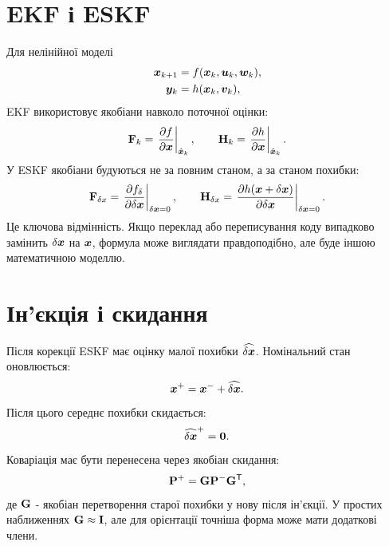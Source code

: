 \section{EKF і ESKF}

Для нелінійної моделі
\begin{align}
\bm{x}_{k+1}&=f(\bm{x}_k,\bm{u}_k,\bm{w}_k),\\
\bm{y}_k&=h(\bm{x}_k,\bm{v}_k),
\end{align}
EKF використовує якобіани навколо поточної оцінки:
\begin{equation}
\mathbf{F}_k=\left.\frac{\partial f}{\partial\bm{x}}\right|_{\hat{\bm{x}}_k},
\qquad
\mathbf{H}_k=\left.\frac{\partial h}{\partial\bm{x}}\right|_{\hat{\bm{x}}_k}.
\end{equation}
У ESKF якобіани будуються не за повним станом, а за станом похибки:
\begin{equation}
\mathbf{F}_{\delta x}=\left.\frac{\partial f_\delta}{\partial\delta\bm{x}}\right|_{\delta\bm{x}=0},
\qquad
\mathbf{H}_{\delta x}=\left.\frac{\partial h(\bm{x}+\delta\bm{x})}{\partial\delta\bm{x}}\right|_{\delta\bm{x}=0}.
\end{equation}
Це ключова відмінність. Якщо переклад або переписування коду випадково замінить $\delta\bm{x}$ на $\bm{x}$, формула може виглядати правдоподібно, але буде іншою математичною моделлю.

\section{Ін'єкція і скидання}

Після корекції ESKF має оцінку малої похибки $\widehat{\delta\bm{x}}$. Номінальний стан оновлюється:
\begin{equation}
\bm{x}^{+}=\bm{x}^{-}+\widehat{\delta\bm{x}}.
\end{equation}
Після цього середнє похибки скидається:
\begin{equation}
\widehat{\delta\bm{x}}^{+}=\bm{0}.
\end{equation}
Коваріація має бути перенесена через якобіан скидання:
\begin{equation}\label{eq:reset_cov_session02}
\mathbf{P}^{+}=\mathbf{G}\mathbf{P}^{-}\mathbf{G}^{\mathsf{T}},
\end{equation}
де $\mathbf{G}$ - якобіан перетворення старої похибки у нову після ін'єкції. У простих наближеннях $\mathbf{G}\approx\mathbf{I}$, але для орієнтації точніша форма може мати додаткові члени.

